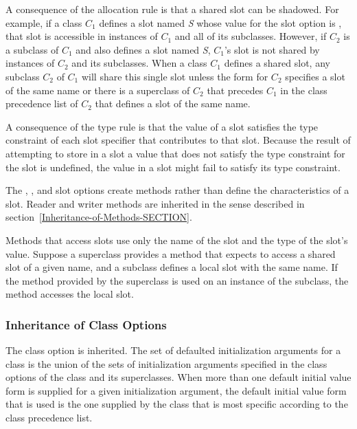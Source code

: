 A consequence of the allocation rule is that a shared slot can be
shadowed.  For example, if a class $C_1$ defines a slot named \emph{S}
whose value for the  slot option is ,
that slot is accessible in instances of $C_1$ and all of its
subclasses.  However, if $C_2$ is a subclass of $C_1$ and also
defines a slot named \emph{S}, $C_1$'s slot is not shared
by instances of $C_2$ and its subclasses. When a class
$C_1$ defines a shared slot, any subclass $C_2$ of $C_1$ will share this single
slot unless the  form for 
$C_2$ specifies a slot of the same name or there is a superclass
of $C_2$ that precedes $C_1$ in the class precedence list of
$C_2$ that defines a slot of the same name.

A consequence of the type rule is that the value of a slot satisfies
the type constraint of each slot specifier that contributes to that
slot. Because the result of attempting to store in a slot a value
that does not satisfy the type constraint for the slot is undefined,
the value in a slot might fail to satisfy its type constraint.

The , , and  slot options
create methods rather than define the characteristics of a slot.
Reader and writer  methods are inherited in the sense described in
section~\ref{Inheritance-of-Methods-SECTION}. 

Methods that access slots use only the name of the slot and the type
of the slot's value.  Suppose a superclass provides a method that
expects to access a shared slot of a given name, and a subclass defines
a local slot with the same name.  If the method provided by the
superclass is used on an instance of the subclass, the method accesses
the local slot.

\subsubsection{Inheritance of Class Options}

The  class option is inherited.  The set of
defaulted initialization arguments for a class is the union of the
sets of initialization arguments specified in the 
 class options of the class and its superclasses.
When more than one default initial value form is supplied for a given
initialization argument, the default initial value form that is used
is the one supplied by the class that is most specific according to
the class precedence list.

